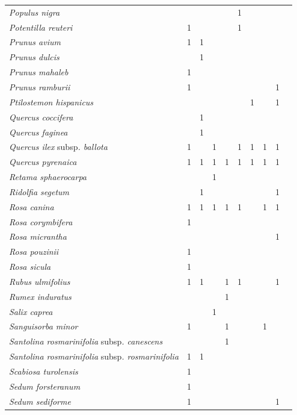 {\begin{longtable}{llllllllll}
\textit{Populus nigra}  &  &  &  &  & 1 &  &  &  \\
\textit{Potentilla reuteri}  & 1 &  &  &  & 1 &  &  &  \\
\textit{Prunus avium}  & 1 & 1 &  &  &  &  &  &  \\
\textit{Prunus dulcis}  &  & 1 &  &  &  &  &  &  \\
\textit{Prunus mahaleb}  & 1 &  &  &  &  &  &  &  \\
\textit{Prunus ramburii}  & 1 &  &  &  &  &  &  & 1 \\
\textit{Ptilostemon hispanicus}  &  &  &  &  &  & 1 &  & 1 \\
\textit{Quercus coccifera}  &  & 1 &  &  &  &  &  &  \\
\textit{Quercus faginea}  &  & 1 &  &  &  &  &  &  \\
\textit{Quercus ilex }subsp\textit{. ballota}  & 1 &  & 1 &  & 1 & 1 & 1 & 1 \\
\textit{Quercus pyrenaica}  & 1 & 1 & 1 & 1 & 1 & 1 & 1 & 1 \\
\textit{Retama sphaerocarpa}  &  &  & 1 &  &  &  &  &  \\
\textit{Ridolfia segetum}  &  & 1 &  &  &  &  &  & 1 \\
\textit{Rosa canina}  & 1 & 1 & 1 & 1 & 1 &  & 1 & 1 \\
\textit{Rosa corymbifera}  & 1 &  &  &  &  &  &  &  \\
\textit{Rosa micrantha}  &  &  &  &  &  &  &  & 1 \\
\textit{Rosa pouzinii}  & 1 &  &  &  &  &  &  &  \\
\textit{Rosa sicula}  & 1 &  &  &  &  &  &  &  \\
\textit{Rubus ulmifolius}  & 1 & 1 &  & 1 & 1 &  &  & 1 \\
\textit{Rumex induratus}  &  &  &  & 1 &  &  &  &  \\
\textit{Salix caprea}  &  &  & 1 &  &  &  &  &  \\
\textit{Sanguisorba minor}  & 1 &  &  & 1 &  &  & 1 &  \\
\textit{Santolina rosmarinifolia }subsp\textit{. canescens}  &  &  &  & 1 &  &  &  &  \\
\textit{Santolina rosmarinifolia }subsp\textit{. rosmarinifolia}  & 1 & 1 &  &  &  &  &  &  \\
\textit{Scabiosa turolensis}  & 1 &  &  &  &  &  &  &  \\
\textit{Sedum forsteranum}  & 1 &  &  &  &  &  &  &  \\
\textit{Sedum sediforme}  & 1 &  &  &  &  &  &  & 1 \\

\end{longtable}}
